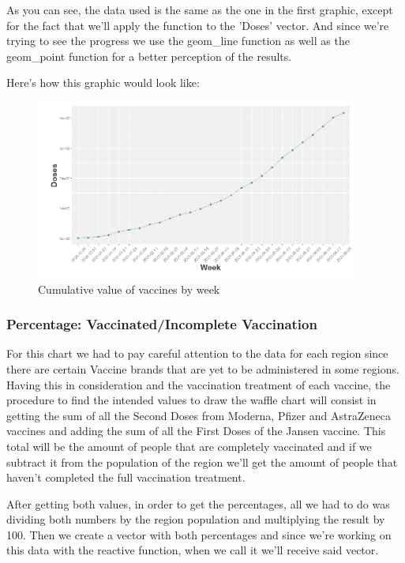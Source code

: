 As you can see, the data used is the same as the one in the first graphic, except for the fact that we'll apply the function to the 'Doses' vector.
And since we're trying to see the progress we use the geom\_line function as well as the geom\_point function for a better perception of the results.


Here's how this graphic would look like:
\begin{figure}[H]
\centering
\includegraphics[width=300pt,trim=10 0 0 -10mm]{images/grafico2novo.png}
\caption{Cumulative value of vaccines by week}
\label{fig:diagrama}
\end{figure}

\subsubsection{Percentage: Vaccinated/Incomplete Vaccination}

For this chart we had to pay careful attention to the data for each region since there are certain Vaccine brands that are yet to be administered in some regions. Having this in consideration and the vaccination treatment of each vaccine, the procedure to find the intended values to draw the waffle chart will consist in getting the sum of all the Second Doses from Moderna, Pfizer and AstraZeneca vaccines and adding the sum of all the First Doses of the Jansen vaccine. This total will be the amount of people that are completely vaccinated and if we subtract it from the population of the region we'll get the amount of people that haven't completed the full vaccination treatment.

After getting both values, in order to get the percentages, all we had to do was dividing both numbers by the region population and multiplying the result by 100. Then we create a vector with both percentages and since we're working on this data with the reactive function, when we call it we'll receive said vector.

